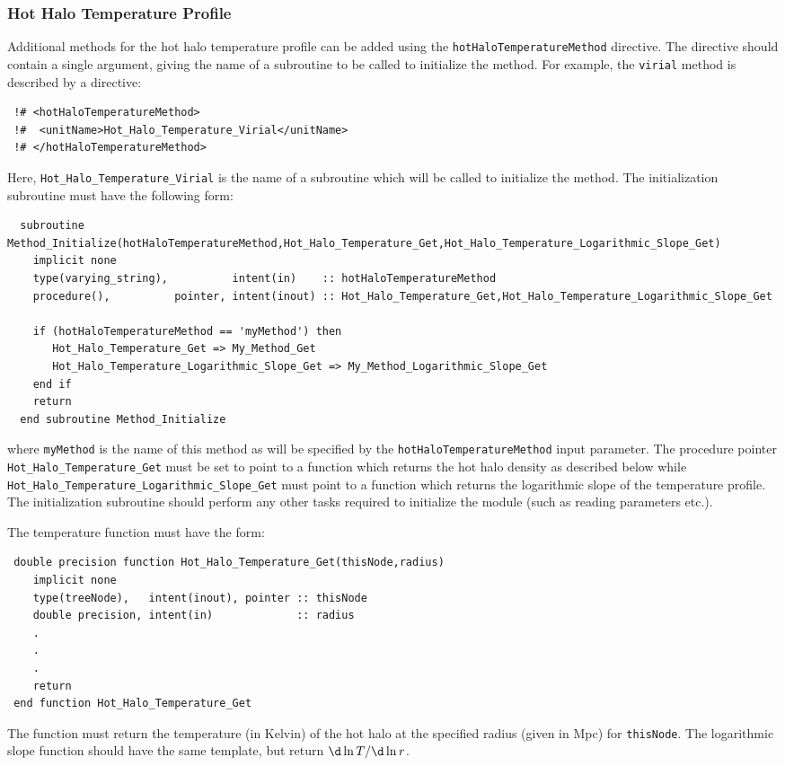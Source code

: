 \subsubsection{Hot Halo Temperature Profile}

Additional methods for the hot halo temperature profile can be added using the {\tt hotHaloTemperatureMethod} directive. The directive should contain a single argument, giving the name of a subroutine to be called to initialize the method. For example, the {\tt virial} method is described by a directive:
\begin{verbatim}
 !# <hotHaloTemperatureMethod>
 !#  <unitName>Hot_Halo_Temperature_Virial</unitName>
 !# </hotHaloTemperatureMethod>
\end{verbatim}
Here, {\tt Hot\_Halo\_Temperature\_Virial} is the name of a subroutine which will be called to initialize the method. The initialization subroutine must have the following form:
\begin{verbatim}
  subroutine Method_Initialize(hotHaloTemperatureMethod,Hot_Halo_Temperature_Get,Hot_Halo_Temperature_Logarithmic_Slope_Get)
    implicit none
    type(varying_string),          intent(in)    :: hotHaloTemperatureMethod
    procedure(),          pointer, intent(inout) :: Hot_Halo_Temperature_Get,Hot_Halo_Temperature_Logarithmic_Slope_Get
    
    if (hotHaloTemperatureMethod == 'myMethod') then
       Hot_Halo_Temperature_Get => My_Method_Get
       Hot_Halo_Temperature_Logarithmic_Slope_Get => My_Method_Logarithmic_Slope_Get
    end if
    return
  end subroutine Method_Initialize
\end{verbatim}
where {\tt myMethod} is the name of this method as will be specified by the {\tt hotHaloTemperatureMethod} input parameter. The procedure pointer {\tt Hot\_Halo\_Temperature\_Get} must be set to point to a function which returns the hot halo density as described below while {\tt Hot\_Halo\_Temperature\_Logarithmic\_Slope\_Get} must point to a function which returns the logarithmic slope of the temperature profile. The initialization subroutine should perform any other tasks required to initialize the module (such as reading parameters etc.).

The temperature function must have the form:
\begin{verbatim}
 double precision function Hot_Halo_Temperature_Get(thisNode,radius)
    implicit none
    type(treeNode),   intent(inout), pointer :: thisNode
    double precision, intent(in)             :: radius
    .
    .
    .
    return
 end function Hot_Halo_Temperature_Get
\end{verbatim}
The function must return the temperature (in Kelvin) of the hot halo at the specified radius (given in Mpc) for {\tt thisNode}. The logarithmic slope function should have the same template, but return $\d\ln T / \d \ln r$.

